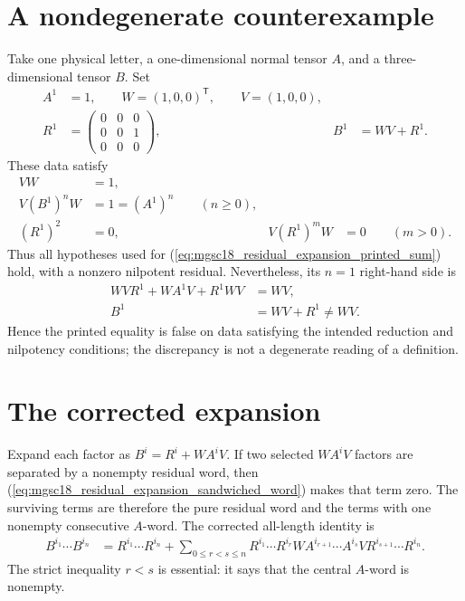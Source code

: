 \documentclass{article}
\begin{document}
\section{A nondegenerate counterexample}

Take one physical letter, a one-dimensional normal tensor $A$, and a
three-dimensional tensor $B$.  Set
\begin{align}
    A^1
        &=1,
        \qquad W=(1,0,0)^{\mathsf T},
        \qquad V=(1,0,0),
    \label{eq:mgsc18_residual_expansion_example_target_and_reduction}\\
    R^1
        &=\begin{pmatrix}
             0&0&0\\
             0&0&1\\
             0&0&0
          \end{pmatrix},
    &B^1
        &=WV+R^1.
    \label{eq:mgsc18_residual_expansion_example_tensors}
\end{align}
These data satisfy
\begin{align}
    VW
        &=1,
    \label{eq:mgsc18_residual_expansion_example_retraction}\\
    V(B^1)^nW
        &=1=(A^1)^n
        \qquad (n\geq0),
    \label{eq:mgsc18_residual_expansion_example_word_reduction}\\
    (R^1)^2
        &=0,
    &V(R^1)^mW
        &=0
        \qquad (m>0).
    \label{eq:mgsc18_residual_expansion_example_residual_properties}
\end{align}
Thus all hypotheses used for
(\ref{eq:mgsc18_residual_expansion_printed_sum}) hold, with a nonzero
nilpotent residual.  Nevertheless, its $n=1$ right-hand side is
\begin{align}
    WVR^1+WA^1V+R^1WV
        &=WV,
    \label{eq:mgsc18_residual_expansion_example_printed_value}\\
    B^1
        &=WV+R^1\ne WV.
    \label{eq:mgsc18_residual_expansion_example_contradiction}
\end{align}
Hence the printed equality is false on data satisfying the intended reduction
and nilpotency conditions; the discrepancy is not a degenerate reading of a
definition.

\section{The corrected expansion}

Expand each factor as $B^i=R^i+WA^iV$.  If two selected $WA^iV$ factors are
separated by a nonempty residual word, then
(\ref{eq:mgsc18_residual_expansion_sandwiched_word}) makes that term zero.
The surviving terms are therefore the pure residual word and the terms with
one nonempty consecutive $A$-word.  The corrected all-length identity is
\begin{align}
    B^{i_1}\cdots B^{i_n}
        &=R^{i_1}\cdots R^{i_n}
          +\sum_{0\leq r<s\leq n}
          R^{i_1}\cdots R^{i_r}
          W A^{i_{r+1}}\cdots A^{i_s}V
          R^{i_{s+1}}\cdots R^{i_n}.
    \label{eq:mgsc18_residual_expansion_corrected_sum}
\end{align}
The strict inequality $r<s$ is essential: it says that the central $A$-word
is nonempty.
\end{document}
